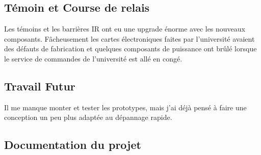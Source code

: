 \documentclass[12pt]{article}
\begin{document}


\subsection{Témoin et Course de relais}
\begin{par}
	Les témoins et les barrières IR ont eu une upgrade 	énorme avec les nouveaux composants. Fâcheusement 	les cartes électroniques faites par l'université 	avaient des défauts de fabrication et quelques 	composants de puissance ont brûlé lorsque le service de commandes de l'université est allé en congé.
\end{par}
\subsection*{Travail Futur}
\begin{par}
 Il me manque monter et tester les prototypes, mais j'ai déjà pensé à faire une conception un peu plus adaptée au dépannage rapide.
\end{par}


\subsection{Documentation du projet}
\end{document}
